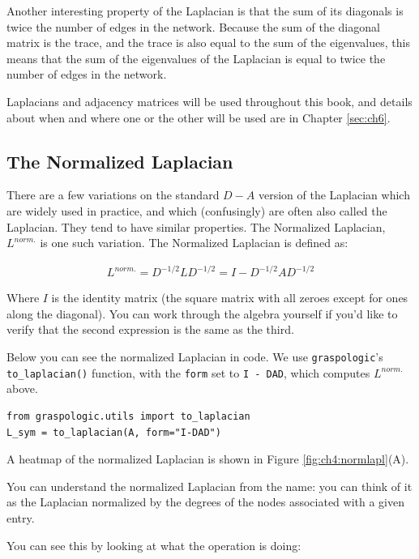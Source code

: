 Another interesting property of the Laplacian is that the sum of its diagonals is twice the number of edges in the network. Because the sum of the diagonal matrix is the trace, and the trace is also equal to the sum of the eigenvalues, this means that the sum of the eigenvalues of the Laplacian is equal to twice the number of edges in the network.

Laplacians and adjacency matrices will be used throughout this book, and details about when and where one or the other will be used are in Chapter \ref{sec:ch6}.

\subsection{The Normalized Laplacian}
\label{sec:ch4:mat-rep:normlapl}

There are a few variations on the standard $D-A$ version of the Laplacian which are widely used in practice, and which (confusingly) are often also called the Laplacian. They tend to have similar properties. The Normalized Laplacian, $L^{norm.}$ is one such variation. The Normalized Laplacian \cite{Chung1996Dec} is defined as:

\begin{align*}
    L^{norm.} = D^{-1/2} L D^{-1/2} = I - D^{-1/2} A D^{-1/2}
\end{align*}

Where $I$ is the identity matrix (the square matrix with all zeroes except for ones along the diagonal). You can work through the algebra yourself if you'd like to verify that the second expression is the same as the third.

Below you can see the normalized Laplacian in code. We use \texttt{graspologic}'s \texttt{to\_laplacian()} function, with the \texttt{form} set to \texttt{I - DAD}, which computes $L^{norm.}$ above.
 
\begin{lstlisting}[style=python]
from graspologic.utils import to_laplacian
L_sym = to_laplacian(A, form="I-DAD")
\end{lstlisting}
A heatmap of the normalized Laplacian is shown in Figure \ref{fig:ch4:normlapl}(A).

You can understand the normalized Laplacian from the name: you can think of it as the Laplacian normalized by the degrees of the nodes associated with a given entry.

You can see this by looking at what the operation is doing:

